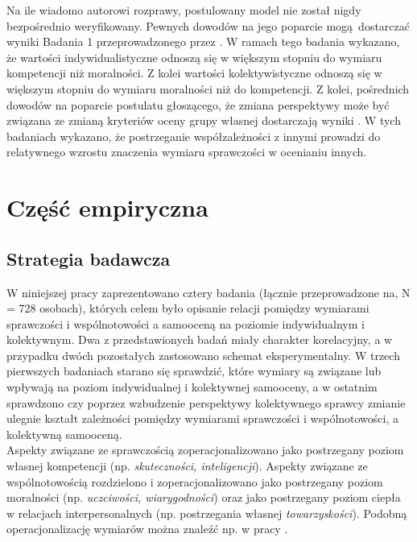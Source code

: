 \documentclass[man]{apa6}
\begin{document}
Na ile wiadomo autorowi rozprawy, postulowany model nie został nigdy bezpośrednio weryfikowany. Pewnych dowodów na jego poparcie mogą dostarczać wyniki Badania 1 przeprowadzonego przez \textcite{wojciszke1997parallels}. W ramach tego badania wykazano, że wartości indywidualistyczne odnoszą się w większym stopniu do wymiaru kompetencji niż moralności. Z kolei wartości kolektywistyczne odnoszą się w większym stopniu do wymiaru moralności niż do kompetencji. Z kolei, pośrednich dowodów na poparcie postulatu głoszącego, że zmiana perspektywy może być związana ze zmianą kryteriów oceny grupy własnej dostarczają wyniki \textcite{wojciszke2008primacy}. W tych badaniach wykazano, że postrzeganie współzależności z innymi prowadzi do relatywnego wzrostu znaczenia wymiaru sprawczości w ocenianiu innych.\\

\newpage
\section{Część empiryczna}

\subsection{Strategia badawcza}

W niniejszej pracy zaprezentowano cztery badania (łącznie przeprowadzone na, N = 728 osobach), których celem było opisanie relacji pomiędzy wymiarami sprawczości i wspólnotowości a samooceną na poziomie indywidualnym i kolektywnym. Dwa z przedstawionych badań miały charakter korelacyjny, a w przypadku dwóch pozostałych zastosowano schemat eksperymentalny. W trzech pierwszych badaniach starano się sprawdzić, które wymiary są związane lub wpływają na poziom indywidualnej i kolektywnej samooceny, a w ostatnim sprawdzono czy poprzez wzbudzenie perspektywy kolektywnego sprawcy zmianie ulegnie kształt zależności pomiędzy wymiarami sprawczości i wspólnotowości, a kolektywną samooceną. \\

Aspekty związane ze sprawczością zoperacjonalizowano jako postrzegany poziom własnej kompetencji (np. \emph{skuteczności, inteligencji}). Aspekty związane ze wspólnotowością rozdzielono i zoperacjonalizowano jako postrzegany poziom moralności (np. \emph{uczciwości, wiarygodności}) oraz jako postrzegany poziom ciepła w relacjach interpersonalnych (np. postrzegania własnej \emph{towarzyskości}). Podobną operacjonalizację wymiarów można znaleźć np. w pracy \textcite{leach2007group}.\\
\end{document}
